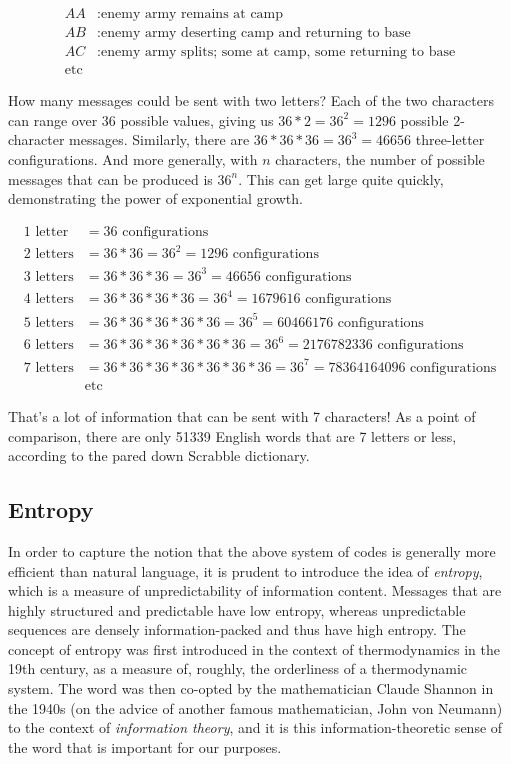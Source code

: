 \documentclass[UTF8]{book}
\begin{document}
\begin{CJK}{UTF8}{gbsn}
\begin{align*}
	AA&: \text{enemy army remains at camp} \\
	AB&: \text{enemy army deserting camp and returning to base} \\
	AC&: \text{enemy army splits; some at camp, some returning to base} \\
        \text{etc} &
\end{align*}

How many messages could be sent with two letters? Each of the two characters can range over 36 possible values, giving us $36*2=36^{2}=1296$ possible 2-character messages. Similarly, there are $36*36*36=36^{3}=46656$ three-letter configurations. And more generally, with $n$ characters, the number of possible messages that can be produced is $36^{n}$. This can get large quite quickly, demonstrating the power of exponential growth.

\begin{align*}
1 \text{ letter} &= 36 \text{ configurations} \\
2 \text{ letters} &= 36*36 = 36^{2} = 1296 \text{ configurations} \\
3 \text{ letters} &= 36*36*36 = 36^{3} = 46656 \text{ configurations} \\
4 \text{ letters} &= 36*36*36*36 = 36^{4} = 1679616 \text{ configurations} \\
5 \text{ letters} &= 36*36*36*36*36 = 36^{5} = 60466176 \text{ configurations} \\
6 \text{ letters} &= 36*36*36*36*36*36 = 36^{6} = 2176782336 \text{ configurations} \\
7 \text{ letters} &= 36*36*36*36*36*36*36 = 36^{7} = 78364164096 \text{ configurations} \\
&\text{etc}
\end{align*}

That's a lot of information that can be sent with 7 characters! As a point of comparison, there are only 51339 English words that are 7 letters or less, according to the pared down Scrabble dictionary.

\subsection{Entropy}

In order to capture the notion that the above system of codes is generally more efficient than natural language, it is prudent to introduce the idea of \emph{entropy}, which is a measure of unpredictability of information content. Messages that are highly structured and predictable have low entropy, whereas unpredictable sequences are densely information-packed and thus have high entropy. The concept of entropy was first introduced in the context of thermodynamics in the 19th century, as a measure of, roughly, the orderliness of a thermodynamic system. The word was then co-opted by the mathematician Claude Shannon in the 1940s (on the advice of another famous mathematician, John von Neumann) to the context of \emph{information theory}, and it is this information-theoretic sense of the word that is important for our purposes.


\end{CJK}
\end{document}
